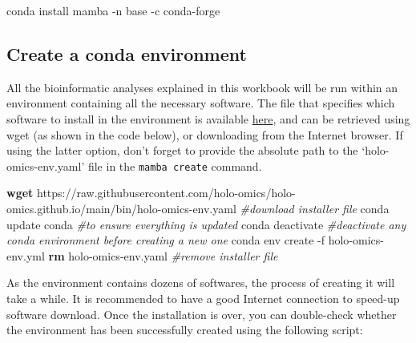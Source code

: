 \documentclass[
]{book}
\newenvironment{Shaded}{\begin{snugshade}}{\end{snugshade}}
\newcommand{\AttributeTok}[1]{\textcolor[rgb]{0.13,0.29,0.53}{#1}}
\newcommand{\CommentTok}[1]{\textcolor[rgb]{0.56,0.35,0.01}{\textit{#1}}}
\newcommand{\ExtensionTok}[1]{#1}
\newcommand{\FunctionTok}[1]{\textcolor[rgb]{0.13,0.29,0.53}{\textbf{#1}}}
\newcommand{\NormalTok}[1]{#1}
\begin{document}
\small

\begin{Shaded}
\begin{Highlighting}[]
\ExtensionTok{conda}\NormalTok{ install mamba }\AttributeTok{{-}n}\NormalTok{ base }\AttributeTok{{-}c}\NormalTok{ conda{-}forge}
\end{Highlighting}
\end{Shaded}

\normalsize

\hypertarget{create-conda-environment}{%
\subsection*{Create a conda environment}\label{create-conda-environment}}

All the bioinformatic analyses explained in this workbook will be run within an environment containing all the necessary software. The file that specifies which software to install in the environment is available \href{https://raw.githubusercontent.com/holo-omics/holo-omics.github.io/main/bin/holo-omics-env.yaml}{here}, and can be retrieved using wget (as shown in the code below), or downloading from the Internet browser. If using the latter option, don't forget to provide the absolute path to the `holo-omics-env.yaml' file in the \texttt{mamba\ create} command.

\small

\begin{Shaded}
\begin{Highlighting}[]
\FunctionTok{wget}\NormalTok{ https://raw.githubusercontent.com/holo{-}omics/holo{-}omics.github.io/main/bin/holo{-}omics{-}env.yaml }\CommentTok{\#download installer file}
\ExtensionTok{conda}\NormalTok{ update conda }\CommentTok{\#to ensure everything is updated}
\ExtensionTok{conda}\NormalTok{ deactivate }\CommentTok{\#deactivate any conda environment before creating a new one}
\ExtensionTok{conda}\NormalTok{ env create }\AttributeTok{{-}f}\NormalTok{ holo{-}omics{-}env.yml}
\FunctionTok{rm}\NormalTok{ holo{-}omics{-}env.yaml }\CommentTok{\#remove installer file}
\end{Highlighting}
\end{Shaded}

\normalsize

As the environment contains dozens of softwares, the process of creating it will take a while. It is recommended to have a good Internet connection to speed-up software download. Once the installation is over, you can double-check whether the environment has been successfully created using the following script:
\end{document}
